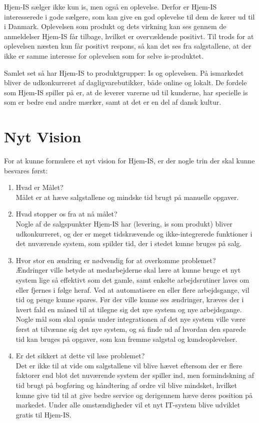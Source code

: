 Hjem-IS sælger ikke kun is, men også en oplevelse. Derfor er Hjem-IS interesserede i gode sælgere, som kan give en god oplevelse til dem de kører ud til i Danmark. Oplevelsen som produkt og dets virkning kan ses gennem de anmeldelser Hjem-IS får tilbage, hvilket er overvældende positivt. Til trods for at oplevelsen næsten kun får positivt respons, så kan det ses fra salgstallene, at der ikke er samme interesse for oplevelsen som for selve is-produktet. 

Samlet set så har Hjem-IS to produktgrupper: Is og oplevelsen. På ismarkedet bliver de udkonkurreret af dagligvarebutikker, både online og lokalt. De fordele som Hjem-IS spiller på er, at de leverer varerne ud til kunderne, har specielle is som er bedre end andre mærker, samt at det er en del af dansk kultur.

\section{Nyt Vision}
For at kunne formulere et nyt vision for Hjem-IS, er der nogle trin\cite{How2bsns} der skal kunne besvares først:
\begin{enumerate}
    \item Hvad er Målet? \\
    Målet er at hæve salgstallene og mindske tid brugt på manuelle opgaver.
    \item Hvad stopper os fra at nå målet? \\
    Nogle af de salgspunkter Hjem-IS har (levering, is som produkt) bliver udkonkurreret, og der er meget tidskrævende og ikke-integrerede funktioner i det nuværende system, som spilder tid, der i stedet kunne bruges på salg.
    \item Hvor stor en ændring er nødvendig for at overkomme problemet? \\
    Ændringer ville betyde at medarbejderne skal lære at kunne bruge et nyt system lige så effektivt som det gamle, samt enkelte arbejdsrutiner laves om eller fjernes i følge heraf. Ved at automatisere en eller flere arbejdsgange, vil tid og penge kunne spares. Før der ville kunne ses ændringer, kræves der i hvert fald en måned til at tilegne sig det nye system og nye arbejdsgange. Nogle mål som skal opnås under integrationen af det nye system ville være først at tilvænne sig det nye system, og så finde ud af hvordan den sparede tid kan bruges på opgaver, som kan fremme salgstal og kundeoplevelser.
    \item Er det sikkert at dette vil løse problemet? \\
    Det er ikke til at vide om salgstallene vil blive hævet eftersom der er flere faktorer end blot det nuværende system der spiller ind, men formindskning af tid brugt på bogføring og håndtering af ordre vil blive mindsket, hvilket kunne give tid til at give bedre service og derigennem hæve deres position på markedet. Under alle omstændigheder vil et nyt IT-system blive udviklet gratis til Hjem-IS.    
\end{enumerate}

